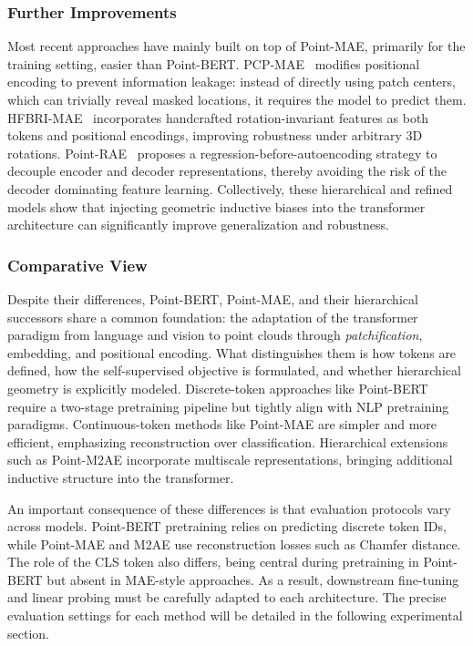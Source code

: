 \subsubsection{Further Improvements}
\label{sssec:further_improvements}

Most recent approaches have mainly built on top of Point-MAE, primarily for the training setting, easier than Point-BERT. PCP-MAE~\cite{pcpmae} modifies positional encoding to prevent information leakage: instead of directly using patch centers, which can trivially reveal masked locations, it requires the model to predict them. HFBRI-MAE~\cite{hfbrimae} incorporates handcrafted rotation-invariant features as both tokens and positional encodings, improving robustness under arbitrary 3D rotations. Point-RAE~\cite{prae} proposes a regression-before-autoencoding strategy to decouple encoder and decoder representations, thereby avoiding the risk of the decoder dominating feature learning. Collectively, these hierarchical and refined models show that injecting geometric inductive biases into the transformer architecture can significantly improve generalization and robustness.

\subsubsection{Comparative View}
\label{sssec:comparative_view}

Despite their differences, Point-BERT, Point-MAE, and their hierarchical successors share a common foundation: the adaptation of the transformer paradigm from language and vision to point clouds through \textit{patchification}, embedding, and positional encoding. What distinguishes them is how tokens are defined, how the self-supervised objective is formulated, and whether hierarchical geometry is explicitly modeled. Discrete-token approaches like Point-BERT require a two-stage pretraining pipeline but tightly align with NLP pretraining paradigms. Continuous-token methods like Point-MAE are simpler and more efficient, emphasizing reconstruction over classification. Hierarchical extensions such as Point-M2AE incorporate multiscale representations, bringing additional inductive structure into the transformer.

An important consequence of these differences is that evaluation protocols vary across models. Point-BERT pretraining relies on predicting discrete token IDs, while Point-MAE and M2AE use reconstruction losses such as Chamfer distance. The role of the CLS token also differs, being central during pretraining in Point-BERT but absent in MAE-style approaches. As a result, downstream fine-tuning and linear probing must be carefully adapted to each architecture. The precise evaluation settings for each method will be detailed in the following experimental section.

